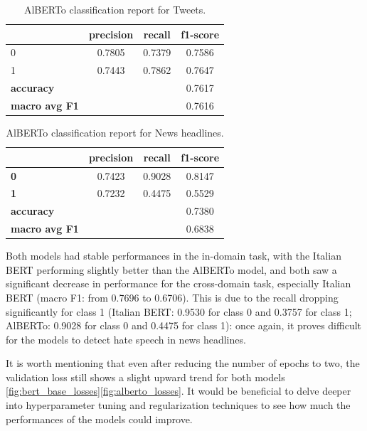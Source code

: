 \begin{table}[h]
    \centering
    \small
    \begin{tabular}{lccc}
        \toprule
        & \textbf{precision} & \textbf{recall} & \textbf{f1-score} \\
        \midrule
        0 & 0.7805 & 0.7379 & 0.7586 \\
        1 & 0.7443 & 0.7862 & 0.7647 \\
        \midrule
        \textbf{accuracy} & & & 0.7617 \\
        \textbf{macro avg F1} & & & 0.7616 \\
        \bottomrule
    \end{tabular}
    \caption{AlBERTo classification report for Tweets.}
    \label{tab:classification_report_alberto_tweets}
\end{table}

\begin{table}[h]
    \centering
    \small
    \begin{tabular}{lccc}
        \toprule
     & \textbf{precision} & \textbf{recall} & \textbf{f1-score} \\
        \midrule
        \textbf{0}          & 0.7423  & 0.9028 & 0.8147  \\
        \textbf{1}          & 0.7232  & 0.4475 & 0.5529  \\
        \midrule
        \textbf{accuracy}   &         &        & 0.7380  \\
        \textbf{macro avg F1}  &   &  & 0.6838  \\
        \bottomrule
    \end{tabular}
    \caption{AlBERTo classification report for News headlines.}
    \label{tab:classification_report_alberto_news}
\end{table}

Both models had stable performances in the in-domain task, with the Italian BERT performing slightly better than the AlBERTo model, and both saw a significant decrease in performance for the cross-domain task, especially Italian BERT (macro F1: from 0.7696 to 0.6706). This is due to the recall dropping significantly for class 1 (Italian BERT: 0.9530 for class 0 and 0.3757 for class 1; AlBERTo: 0.9028 for class 0 and 0.4475 for class 1): once again, it proves difficult for the models to detect hate speech in news headlines.

It is worth mentioning that even after reducing the number of epochs to two, the validation loss still shows a slight upward trend for both models \ref{fig:bert_base_losses}\ref{fig:alberto_losses}. It would be beneficial to delve deeper into hyperparameter tuning and regularization techniques to see how much the performances of the models could improve.

